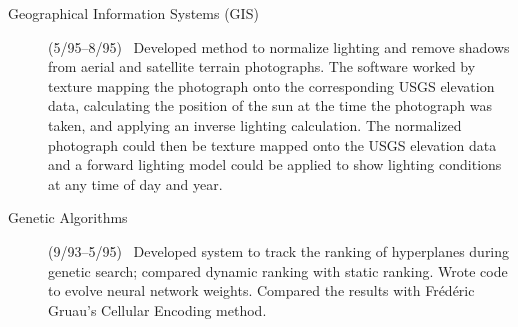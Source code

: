 \documentclass[11pt]{resume}
\begin{document}
\begin{description}
      \item[Geographical Information Systems (GIS)](5/95--8/95)
        \ Developed method to normalize lighting and remove shadows 
        from aerial and satellite terrain photographs.  The software
        worked by texture mapping the photograph onto the corresponding
        USGS elevation data, calculating the position of the sun at the
        time the photograph was taken, and applying an inverse lighting
        calculation.  The normalized photograph could then be texture mapped
        onto the USGS elevation data and a forward lighting model could
        be applied to show lighting conditions at any time of day and year.
      \item[Genetic Algorithms](9/93--5/95)
        \ Developed system to 
        track the ranking of hyperplanes during genetic search;
        compared dynamic ranking with static ranking.
        Wrote code to evolve neural network weights. Compared the
        results with Fr\'ed\'eric Gruau's Cellular Encoding method.  
\end{description}
\end{document}
